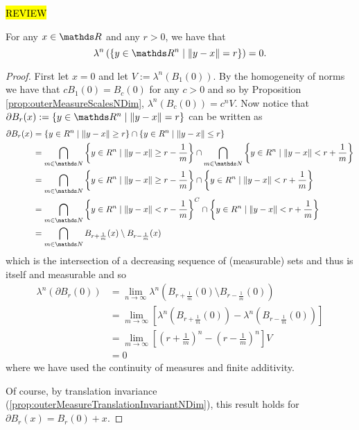 \hl{REVIEW}
\begin{lem}
	\label{lem:ballBoundaryMeasureZero} For any $x \in \R$ and any $r > 0$, we have that 
	\[
		\lambda^n\left(\{y\in \R^n \mid \lVert y - x \rVert = r\}\right) = 0.
	\]
\end{lem}
\begin{proof}
	First let $x = 0$  and let $V := \lambda^n\left(B_1(0)\right)$. By the homogeneity of norms we have that $cB_1(0) = B_c(0)$ for any $c > 0$ and so by Proposition \ref{prop:outerMeasureScalesNDim}, $\lambda^n\left(B_c(0)\right) = c^nV$. Now notice that $\partial B_r(x) := \{y\in \R^n \mid \lVert y - x \rVert = r\}$ can be written as 
	\begin{align*}
		\partial B_r(x) &= \{y \in R^n \mid \lVert y - x \rVert \geq r \} \cap \{y \in R^n \mid \lVert y - x \rVert \leq r \} \\
		&= \bigcap_{m \in \N} \left\{y \in R^n \mid \lVert y - x \rVert \geq r - \frac{1}{m}  \right\} \cap \bigcap_{m \in \N}\left\{y \in R^n \mid \lVert y - x \rVert < r + \frac{1}{m} \right\} \\
		&=\bigcap_{m \in \N}  \left\{y \in R^n \mid \lVert y - x \rVert \geq r - \frac{1}{m}  \right\} \cap \left\{y \in R^n \mid \lVert y - x \rVert < r + \frac{1}{m} \right\} \\
		&= \bigcap_{m \in \N}  \left\{y \in R^n \mid \lVert y - x \rVert < r - \frac{1}{m}  \right\}^C \cap \left\{y \in R^n \mid \lVert y - x \rVert < r + \frac{1}{m} \right\} \\
		&= \bigcap_{m \in \N} B_{r+\frac{1}{m}}(x) \setminus B_{r-\frac{1}{m}}(x)
	\end{align*}
	which is the intersection of a decreasing sequence of (measurable) sets and thus is itself and measurable and so
	\begin{align*}
		\lambda^n\left(\partial B_r(0)\right) &= \lim_{n\to\infty} \lambda^n\left(B_{r+\frac{1}{m}}(0) \setminus B_{r-\frac{1}{m}}(0)\right) \\
		&= \lim_{m\to\infty}\left[ \lambda^n\left(B_{r+\frac{1}{m}}(0)\right) - \lambda^n\left(B_{r-\frac{1}{m}}(0)\right)\right] \\
		&= \lim_{m \to \infty} \left[ \left(r + \frac{1}{m}\right)^n -  \left(r - \frac{1}{m}\right)^n  \right] V \\
		&= 0
	\end{align*}
	where we have used the continuity of measures and finite additivity. 
	
	Of course, by translation invariance (\ref{prop:outerMeasureTranslationInvariantNDim}), this result holds for $\partial B_r(x) = B_r(0) + x$.
	
\end{proof}

